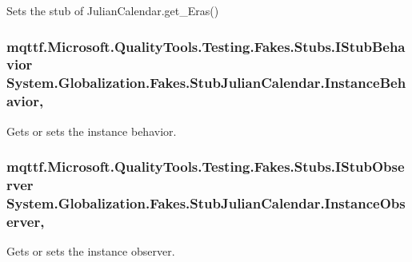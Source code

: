 Sets the stub of Julian\-Calendar.\-get\-\_\-\-Eras()

\hypertarget{class_system_1_1_globalization_1_1_fakes_1_1_stub_julian_calendar_a59ee3d27d8c5b5a85aa22ac427aad413}{
\subsubsection[{Instance\-Behavior}]{\setlength{\rightskip}{0pt plus 5cm}mqttf.\-Microsoft.\-Quality\-Tools.\-Testing.\-Fakes.\-Stubs.\-I\-Stub\-Behavior System.\-Globalization.\-Fakes.\-Stub\-Julian\-Calendar.\-Instance\-Behavior\hspace{0.3cm}{\ttfamily [get]}, {\ttfamily [set]}}}\label{class_system_1_1_globalization_1_1_fakes_1_1_stub_julian_calendar_a59ee3d27d8c5b5a85aa22ac427aad413}


Gets or sets the instance behavior.

\hypertarget{class_system_1_1_globalization_1_1_fakes_1_1_stub_julian_calendar_a00ebbe352e8ab5f1856bd68b08dd7889}{
\subsubsection[{Instance\-Observer}]{\setlength{\rightskip}{0pt plus 5cm}mqttf.\-Microsoft.\-Quality\-Tools.\-Testing.\-Fakes.\-Stubs.\-I\-Stub\-Observer System.\-Globalization.\-Fakes.\-Stub\-Julian\-Calendar.\-Instance\-Observer\hspace{0.3cm}{\ttfamily [get]}, {\ttfamily [set]}}}\label{class_system_1_1_globalization_1_1_fakes_1_1_stub_julian_calendar_a00ebbe352e8ab5f1856bd68b08dd7889}


Gets or sets the instance observer.


